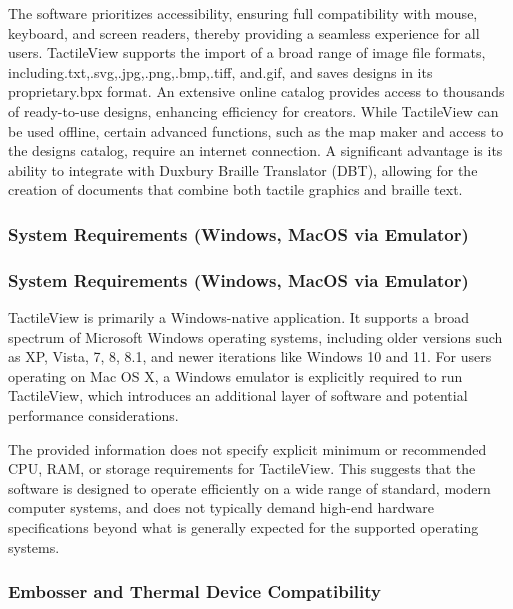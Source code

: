 The software prioritizes accessibility, ensuring full compatibility with mouse, keyboard, and screen readers, thereby providing a seamless experience for all users. \cite{DuxburyDetails,BlindSVG} TactileView supports the import of a broad range of image file formats, including.txt,.svg,.jpg,.png,.bmp,.tiff, and.gif, and saves designs in its proprietary.bpx format. \cite{DuxburyDetails,BlindSVG,DuxburyNews} An extensive online catalog provides access to thousands of ready-to-use designs, enhancing efficiency for creators. \cite{DuxburyDetails,BlindSVG,DuxburyNews} While TactileView can be used offline, certain advanced functions, such as the map maker and access to the designs catalog, require an internet connection. \cite{DuxburyDetails,BlindSVG,DuxburyNews} A significant advantage is its ability to integrate with Duxbury Braille Translator (DBT), allowing for the creation of documents that combine both tactile graphics and braille text. \cite{DuxburyDetails}

\subsubsection{System Requirements (Windows, MacOS via Emulator)}

\subsubsection{System Requirements (Windows, MacOS via Emulator)}

TactileView is primarily a Windows-native application. It supports a broad spectrum of Microsoft Windows operating systems, including older versions such as XP, Vista, 7, 8, 8.1, and newer iterations like Windows 10 and 11. \cite{DuxburyDetails,BlindSVG,DuxburyNews} For users operating on Mac OS X, a Windows emulator is explicitly required to run TactileView, which introduces an additional layer of software and potential performance considerations. \cite{DuxburyDetails,BlindSVG,DuxburyNews}

The provided information does not specify explicit minimum or recommended CPU, RAM, or storage requirements for TactileView. \cite{DuxburyDetails,BlindSVG,DuxburyNews} This suggests that the software is designed to operate efficiently on a wide range of standard, modern computer systems, and does not typically demand high-end hardware specifications beyond what is generally expected for the supported operating systems.

\subsubsection{Embosser and Thermal Device Compatibility}

